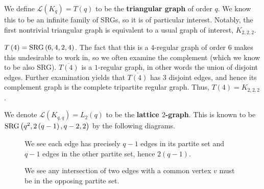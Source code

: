 \begin{definition}
	We define \(\mathscr{L}\left( K_{q} \right) = T\left( q \right) \) to be the \textbf{triangular graph} of order \(q\). We know this to be an infinite family of SRGs, so it is of particular interest. Notably, the first nontrivial triangular graph is equivalent to a usual graph of interest, \(K_{2, 2, 2}\).
\end{definition}
\newpage
\begin{example}
	\(T\left( 4 \right) = \operatorname{SRG}\left( 6, 4, 2, 4 \right) \). The fact that this is a \(4\)-regular graph of order \(6\) makes this undesirable to work in, so we often examine the complement (which we know to be also SRG). \(\overline{T\left( 4 \right) }\) is a \(1\)-regular graph, in other words the union of disjoint edges. Further examination yields that \(\overline{T\left( 4 \right) }\) has \(3\) disjoint edges, and hence its complement graph is the complete tripartite regular graph. Thus, \(T\left( 4 \right) = K_{2, 2, 2}\).
\end{example}
\newpage
\begin{definition}
	We denote \(\mathscr{L}\left( K_{q, q} \right) = L_{2}\left( q \right)  \) to be the \textbf{lattice \(2\)-graph}. This is known to be \(\operatorname{SRG}\left( q^2, 2\left( q-1 \right) , q-2, 2 \right) \) by the following diagrams.
\end{definition}
\begin{figure}[ht]
    \centering
    \caption{We see each edge has precisely \(q-1\) edges in its partite set and \(q-1\) edges in the other partite set, hence \(2\left( q-1 \right). \)}
    \label{fig:linekqq}
\end{figure}
\begin{figure}[ht]
    \centering
    \caption{We see any intersection of two edges with a common vertex \(v\) must be in the opposing partite set.}
    \label{fig:linekqq2}
\end{figure}

